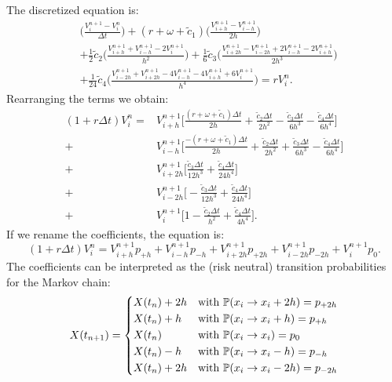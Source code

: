 \documentclass[]{interact}
\newcommand{\numberset}{\mathbb}
\newcommand{\PP}{\numberset{P}}
\theoremstyle{plain}%
\theoremstyle{definition}
\theoremstyle{remark}
\begin{document}
The discretized equation is:
\begin{align}
 &\biggl( \frac{V^{n+1}_i - V^n_i}{\Delta t} \biggr) 
 + (r+\omega+\tilde c_1) \biggl( \frac{V^{n+1}_{i + h} - V^{n+1}_{i-h}}{2h} \biggr)\\ \nonumber
 &+ \frac{1}{2} \tilde c_2 \biggl( \frac{V^{n+1}_{i + h} + V^{n+1}_{i - h} - 2V^{n+1}_{i}}{h^2} \biggr)
 + \frac{1}{6} \tilde c_3 \biggl( \frac{ V^{n+1}_{i + 2h} - V^{n+1}_{i - 2h} 
 +2V^{n+1}_{i - h} - 2V^{n+1}_{i + h} }{2h^3} \biggr) \\ \nonumber		
 &+ \frac{1}{24} \tilde c_4 \biggl( \frac{ V^{n+1}_{i - 2h} + V^{n+1}_{i + 2h} -4V^{n+1}_{i - h} - 
 4V^{n+1}_{i + h} + 6V^{n+1}_{i}}{h^4} \biggr) 
 = rV^n_i .
\end{align}
Rearranging the terms we obtain:
\begin{align}
(1+r\Delta t) V^n_i =& V^{n+1}_{i + h} \biggl[ \frac{(r+\omega+\tilde c_1)\Delta t}{2h} + \frac{\tilde c_2 \Delta t}{2h^2} 
-\frac{\tilde c_3 \Delta t}{6h^3} - \frac{\tilde c_4 \Delta t}{6h^4} \biggr] \\ \nonumber
+& V^{n+1}_{i - h} \biggl[ \frac{-(r+\omega+\tilde c_1)\Delta t}{2h} + \frac{\tilde c_2 \Delta t}{2h^2} 
+\frac{\tilde c_3 \Delta t}{6h^3} - \frac{\tilde c_4 \Delta t}{6h^4} \biggr] \\ \nonumber
+& V^{n+1}_{i + 2h} \biggl[ \frac{\tilde c_3 \Delta t}{12h^3} + \frac{\tilde c_4 \Delta t}{24h^4} \biggr] \\ \nonumber
+& V^{n+1}_{i - 2h} \biggl[ -\frac{\tilde c_3 \Delta t}{12h^3} + \frac{\tilde c_4 \Delta t}{24h^4} \biggr] \\ \nonumber
+& V^{n+1}_{i} \biggl[ 1 - \frac{\tilde c_2 \Delta t}{h^2} + \frac{\tilde c_4 \Delta t}{4h^4} \biggr].
\end{align}
If we rename the coefficients, the equation is:
\begin{equation}\label{prob_coeff}
 (1+r\Delta t) V^n_i = V^{n+1}_{i + h} p_{+h} + V^{n+1}_{i - h} p_{-h} +
  V^{n+1}_{i + 2h} p_{+2h} + V^{n+1}_{i - 2h} p_{-2h} + V^{n+1}_{i} p_{0}. 
\end{equation}
The coefficients can be interpreted as the (risk neutral) transition probabilities for the Markov chain:
\[
X(t_{n+1}) = \begin{dcases}
         X(t_{n}) + 2h & \mbox{with  } \PP(x_i \to x_i +2 h) = p_{+2h} \\
         X(t_{n}) + h & \mbox{with  } \PP(x_i \to x_i + h) = p_{+h} \\
	 X(t_{n})     & \mbox{with  } \PP(x_i \to x_i) = p_{0}   \\
	 X(t_{n}) - h & \mbox{with  } \PP(x_i \to x_i - h) = p_{-h} \\
         X(t_{n}) + 2h & \mbox{with  } \PP(x_i \to x_i -2 h) = p_{-2h}
        \end{dcases} 
\]
\end{document}
